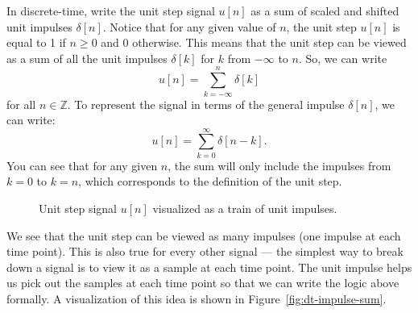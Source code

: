 \begin{popquiz}
In discrete-time, write the unit step signal $u[n]$ as a sum of scaled and shifted unit impulses $\delta[n]$. 
\popqsplit
Notice that for any given value of $n$, the unit step $u[n]$ is equal to 1 if $n \geq 0$ and 0 otherwise. This means that the unit step can be viewed as a sum of all the unit impulses $\delta[k]$ for $k$ from $-\infty$ to $n$. So, we can write
\[
u[n] = \sum_{k=-\infty}^{n} \delta[k]
\]
for all $n \in \mathbb{Z}$. To represent the signal in terms of the general impulse $\delta[n]$, we can write:
\[
u[n] = \sum_{k=0}^{\infty} \delta[n-k].
\]
You can see that for any given $n$, the sum will only include the impulses from $k=0$ to $k=n$, which corresponds to the definition of the unit step. 
\end{popquiz}
\begin{figure}[h]
\centering
{}

\caption{Unit step signal $u[n]$ visualized as a train of unit impulses.}
\label{fig:d-t-unit-step}
\end{figure} 


We see that the unit step can be viewed as many impulses (one impulse at each time point). This is also true for every other signal --- the simplest way to break down a signal is to view it as a sample at each time point. The unit impulse helps us pick out the samples at each time point so that we can write the logic above formally. A visualization of this idea is shown in Figure~\ref{fig:dt-impulse-sum}. 

